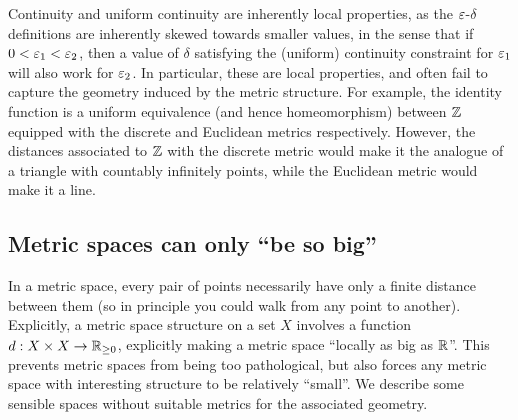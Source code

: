 \documentclass[11pt]{article}
\begin{document}
Continuity and uniform continuity are inherently local properties, as the $\varepsilon$-$\delta$ definitions are inherently skewed towards smaller values, in the sense that if $0 < \varepsilon_1 < \varepsilon_2$, then a value of $\delta$ satisfying the (uniform) continuity constraint for $\varepsilon_1$ will also work for $\varepsilon_2$. In particular, these are local properties, and often fail to capture the geometry induced by the metric structure. For example, the identity function is a uniform equivalence (and hence homeomorphism) between $\mathbb{Z}$ equipped with the discrete and Euclidean metrics respectively. However, the distances associated to $\mathbb{Z}$ with the discrete metric would make it the analogue of a triangle with countably infinitely points, while the Euclidean metric would make it a line.

\subsection{Metric spaces can only ``be so big''}
In a metric space, every pair of points necessarily have only a finite distance between them (so in principle you could walk from any point to another). Explicitly, a metric space structure on a set $X$ involves a function $d : X \times X \to \mathbb{R}_{\geq 0}$, explicitly making a metric space ``locally as big as $\mathbb{R}$''. This prevents metric spaces from being too pathological, but also forces any metric space with interesting structure to be relatively ``small''. We describe some sensible spaces without suitable metrics for the associated geometry.
\end{document}
